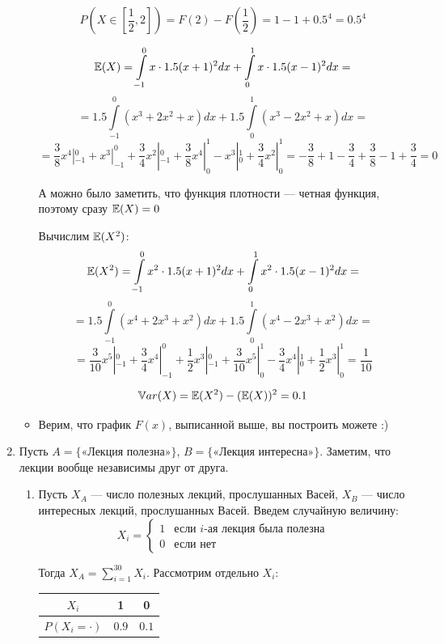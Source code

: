\documentclass[12pt, a4paper]{article}\usepackage[]{graphicx}\usepackage[]{color}
\begin{document}
\begin{enumerate}
\begin{itemize}
$$P\left(X \in \left[\dfrac{1}{2}, 2 \right]  \right) = F(2) - F\left(\dfrac{1}{2} \right) = 1 - 1 +0.5^4 = 0.5^4 $$

$$\mathbb{E}(X) = \int \limits_{-1}^0 x \cdot 1.5 (x + 1)^2 dx +  \int \limits_0^1 x \cdot 1.5 (x - 1)^2 dx = $$
$$= 1.5 \int \limits_{-1}^0\left( x^3 + 2x^2 + x\right) dx + 1.5 \int \limits_0^1\left( x^3 -2x^2 + x\right) dx = $$
$$=  \dfrac{3}{8} x^4 |_{-1}^0 + x^3 |_{-1}^0 + \dfrac{3}{4} x^2|_{-1}^0+    \dfrac{3}{8} x^4 |_0^1   - x^3 |_0^1 + \dfrac{3}{4} x^2|_0^1  = - \dfrac{3}{8}  + 1- \dfrac{3}{4} + \dfrac{3}{8} - 1 +\dfrac{3}{4} = 0 $$

А можно было заметить, что функция плотности — четная функция, поэтому сразу $\mathbb{E}(X) = 0$

Вычислим $\mathbb{E}(X^2)$:
$$\mathbb{E}(X^2) = \int \limits_{-1}^0 x^2 \cdot 1.5 (x + 1)^2 dx +  \int \limits_0^1 x^2 \cdot 1.5 (x - 1)^2 dx = $$
$$= 1.5 \int \limits_{-1}^0\left( x^4 + 2x^3 + x^2\right) dx + 1.5 \int \limits_0^1\left( x^4 -2x^3 + x^2\right) dx = $$
$$=  \dfrac{3}{10} x^5 |_{-1}^0 + \dfrac{3}{4} x^4|_{-1}^0 + \dfrac{1}{2} x^3 |_{-1}^0 +  \dfrac{3}{10} x^5 |_0^1 - \dfrac{3}{4} x^4|_0^1  + \dfrac{1}{2} x^3 |_0^1 =  \dfrac{1}{10}$$

$$\mathbb{V}ar(X) = \mathbb{E}(X^2) - (\mathbb{E}(X))^2 = 0.1$$

\item Верим, что график $F(x)$, выписанной выше, вы построить можете :)
\end{itemize}
\item
Пусть $A = \{\text{«Лекция полезна»}\}$, $B = \{\text{«Лекция интересна»}\}$. Заметим, что лекции вообще независимы друг от друга.

\begin{enumerate}
\item Пусть $X_A$ — число полезных лекций, прослушанных Васей,  $X_B$ — число интересных лекций, прослушанных Васей. Введем случайную величину:
$$X_i =
\begin{cases}
1 & \text{если } i\text{-ая лекция была полезна}\\
0 & \text{если нет}
\end{cases}
$$

Тогда $X_A = \sum\limits_{i=1}^{30}X_i$. Рассмотрим отдельно $X_i$: \hspace{0.5cm}
\begin{minipage}{0.3\linewidth}

\begin{tabular}{c|c|c}
$X_i$ & 1 & 0 \\
\hline
$P(X_i = \cdot)$ & $0.9$ & $0.1$
\end{tabular}
\end{minipage}


\end{enumerate}
\end{enumerate}
\end{document}
